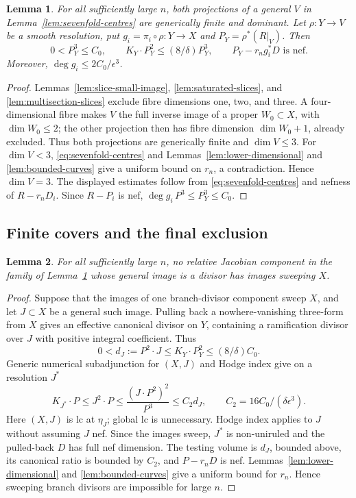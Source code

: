 \documentclass[12pt,a4paper,psamsfonts]{amsart}
\theoremstyle{definition}
\theoremstyle{plain}
\newtheorem{lemma}{Lemma}[section]
\begin{document}
\begin{lemma}\label{lem:finite-correspondences}
For all sufficiently large $n$, both projections of a general
$V$ in Lemma~\ref{lem:sevenfold-centres} are generically finite
and dominant. Let $\rho:Y\to V$ be a smooth resolution, put
$g_i=\pi_i\circ\rho:Y\to X$ and $P_Y=\rho^*(R|_V)$. Then
\begin{equation}\label{eq:correspondence-estimates}
 0<P_Y^3\le C_0,\qquad K_Y\cdot P_Y^2\le(8/\delta)P_Y^3,
 \qquad P_Y-r_ng_i^*D\text{ is nef}.
\end{equation}
Moreover, $\deg g_i\le2C_0/\epsilon^3$.
\end{lemma}
\begin{proof}
Lemmas~\ref{lem:slice-small-image}, \ref{lem:saturated-slices},
and \ref{lem:multisection-slices} exclude fibre dimensions one,
two, and three. A four-dimensional fibre makes $V$ the full
inverse image of a proper $W_0\subset X$, with $\dim W_0\le2$;
the other projection then has fibre dimension $\dim W_0+1$, already
excluded. Thus both projections are generically finite and $\dim V\le3$.
For $\dim V<3$, \eqref{eq:sevenfold-centres} and
Lemmas~\ref{lem:lower-dimensional} and \ref{lem:bounded-curves}
give a uniform bound on $r_n$, a contradiction. Hence $\dim V=3$.
The displayed estimates follow from \eqref{eq:sevenfold-centres}
and nefness of $R-r_nD_i$.
Since $R-P_i$ is nef, $\deg g_i\,P^3\le P_Y^3\le C_0$.
\end{proof}


\subsection{Finite covers and the final exclusion}

\begin{lemma}\label{lem:branch-surfaces}
For all sufficiently large $n$, no relative Jacobian component
in the family of Lemma~\ref{lem:finite-correspondences} whose
general image is a divisor has images sweeping $X$.
\end{lemma}
\begin{proof}
Suppose that the images of one branch-divisor component sweep
$X$, and let $J\subset X$ be a general such image. Pulling back
a nowhere-vanishing three-form from $X$ gives an effective
canonical divisor on $Y$, containing a ramification divisor
over $J$ with positive integral coefficient. Thus
\[
 0<d_J:=P^2\cdot J\le K_Y\cdot P_Y^2\le(8/\delta)C_0.
\]
Generic numerical subadjunction for $(X,J)$ and Hodge index give
on a resolution $J^*$
\begin{equation}\label{eq:branch-surface}
 K_{J^*}\cdot P\le J^2\cdot P
 \le\frac{(J\cdot P^2)^2}{P^3}\le C_2d_J,
 \qquad C_2=16C_0/(\delta\epsilon^3).
\end{equation}
Here $(X,J)$ is lc at $\eta_J$; global lc is unnecessary.
Hodge index applies to $J$ without assuming $J$ nef.
Since the images sweep, $J^*$ is non-uniruled and the pulled-back
$D$ has full nef dimension. The testing volume is $d_J$, bounded
above, its canonical ratio is bounded by $C_2$, and $P-r_nD$ is
nef. Lemmas~\ref{lem:lower-dimensional} and
\ref{lem:bounded-curves} give a uniform bound for $r_n$.
Hence sweeping branch divisors are impossible for large $n$.
\end{proof}
\end{document}
